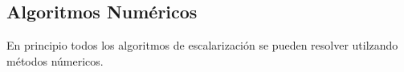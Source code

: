 



\subsection{Algoritmos Num\'ericos}

En principio todos los algoritmos de escalarizaci\'on se pueden resolver utilzando m\'etodos n\'umericos.\\

